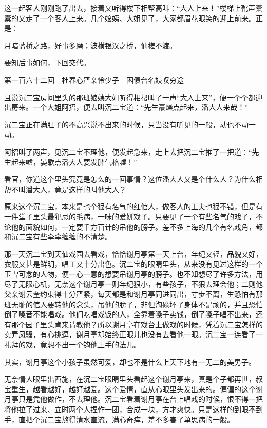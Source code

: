 \documentclass[12pt,UTF8]{ctexbook}
\begin{document}
{{{这一起客人刚刚跑了出去，接着又听得楼下相帮高叫：“大人上来！”楼梯上靴声橐橐的又走了一个客人上来。几个娘姨、大姐见了，大家都眉花眼笑的迎上前来。正是：

月暗蓝桥之路，好事多磨；波横银汉之桥，仙槎不渡。

要知后事如何，下回交代。





第一百六十二回　杜春心严亲怜少子　困债台名妓叹穷途





且说沉二宝房间里头的那班娘姨大姐听得相帮叫了一声“大人上来”，便一个个都迎出房来。一个大姐阿招，便去叫沉二宝道：“先生豪燥点起来，潘大人来哉！”

沉二宝正在满肚子的不高兴说不出来的时候，只当没有听见的一般，动也不动一动。

阿招叫了两声，见沉二宝不理他，便发起急来，走上去把沉二宝推了一把道：“先生起来嘘，晏歇点潘大人要发脾气格嘘！”

看官，你道这个里头究竟是怎么的一回事情？这位潘大人又是个什么人？为什么相帮不叫潘大人，竟是这样的叫他大人？

原来这个沉二宝，本来是也个狠有名气的红倌人，做客人的工夫也狠不错，但是有一件堂子里头最犯忌的毛病，一味的爱姘戏子。只要见了一个有些名气的戏子，不论他的面貌如何，一定要千方百计的吊他的膀子。差不多上海的几个有名戏角，都和沉二宝有些牵牵缠缠的不清楚。

那一天沉二宝到天仙戏园去看戏，恰恰谢月亭第一天上台，年纪又轻，品貌又好，衣服又甚是鲜明，唱工又十分出色。沉二宝的眼睛里头，从来没有见过这样的一个玉雪可念的人物，便一心一意的想要吊谢月亭的膀子。也不知想尽了许多方法，用尽了无限心机，无奈这个谢月亭一则年纪狠小，有些孩子，不狠去理会他；二则他父亲谢云奎约束得十分严紧，每天都是和谢月亭同进同出，寸步不离，生恐怕有那班无耻的倌人要转他的念头，吊他的膀子，非但淘碌坏了身体不是顽的，并且恐怕倒了嗓音不能唱戏。他们吃唱戏饭的人，全靠着嗓子卖钱，倒了嗓子唱不出来，还有那个园子里头肯来请教他？所以谢月亭在戏台上做戏的时候，凭着沉二宝怎样的卖弄凤骚，有心挑逗，谢月亭却始终正眼儿也没有去看他一眼。沉二宝一连看了一礼拜的戏，竟想不出一个钩他上手的法儿。

其实，谢月亭这个小孩子虽然可爱，却也不是什么上天下地有一无二的美男子。

无奈情人眼里出西施，在沉二宝眼睛里头看起这个谢月亭来，真是个子都再世，叔宝重生，越看越好，越好越爱。这个爱情，直从心眼里头发出来的。偏偏的这个谢月亭只是凭他做作，不去理他。沉二宝看着谢月亭在台上唱戏的时候，恨不得一把将他拉了过来、立时两个人捏作一团，合成一块，方才爽快。只是这样的到眼不到手，直把个沉二宝熬得清水直流，满心奇痒，差不多害了单思病的一般。

}}}
\end{document}
